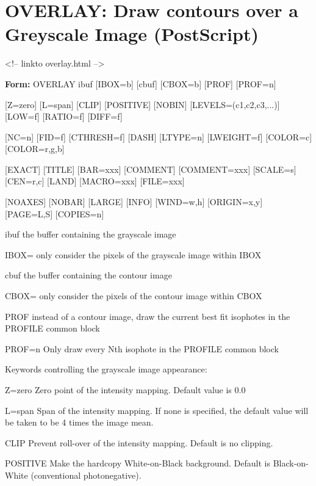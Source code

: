 \section{OVERLAY: Draw contours over a Greyscale Image (PostScript)}
\begin{rawhtml}
<!-- linkto overlay.html -->
\end{rawhtml}
\begin{command}
  \item[\textbf{Form:} OVERLAY ibuf {[IBOX=b]} {[cbuf]} {[CBOX=b]} {[PROF]} 
       {[PROF=n]}\hfill]{}
  \item[{[Z=zero]} {[L=span]} {[CLIP]} {[POSITIVE]} {[NOBIN]}
        {[LEVELS=(c1,c2,c3,...)]} {[LOW=f]} {[RATIO=f]} {[DIFF=f]}]{}
  \item[{[NC=n]} {[FID=f]} {[CTHRESH=f]} {[DASH]} {[LTYPE=n]} {[LWEIGHT=f]} 
        {[COLOR=c]} {[COLOR=r,g,b]}]{}
  \item[{[EXACT]} {[TITLE]} {[BAR=xxx]} {[COMMENT]} {[COMMENT=xxx]}
        {[SCALE=s]} {[CEN=r,c]} {[LAND]} {[MACRO=xxx]} {[FILE=xxx]}]{}
  \item[{[NOAXES]} {[NOBAR]} {[LARGE]} {[INFO]} {[WIND=w,h]} {[ORIGIN=x,y]} 
        {[PAGE=L,S]} {[COPIES=n]}]{}
  \item[ibuf ]{the buffer containing the grayscale image}
  \item[IBOX=]{only consider the pixels of the grayscale image within IBOX}
  \item[cbuf]{ the buffer containing the contour image}
  \item[CBOX=]{only consider the pixels of the contour image within CBOX}
  \item[PROF]{ instead of a contour image, draw the current best fit 
isophotes in the PROFILE common block}
  \item[PROF=n]{Only draw every Nth isophote in the PROFILE common block}
  \item[Keywords controlling the grayscale image appearance:\hfill]{}
  \item[Z=zero ]{Zero point of the intensity mapping.  Default value is 0.0}
  \item[L=span]{Span of the intensity mapping.  If none is specified, the 
                default value will be taken to be 4 times the image mean.}
  \item[CLIP]{Prevent roll-over of the intensity mapping.  Default is 
              no clipping.}
  \item[POSITIVE]{Make the hardcopy White-on-Black background.  Default is 
                  Black-on-White (conventional photonegative).}

\end{command}
